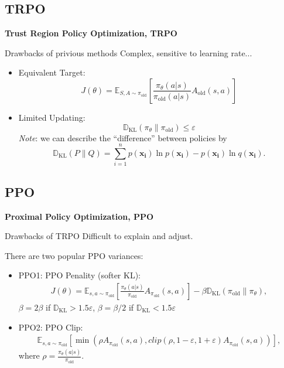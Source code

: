 \subsection{TRPO}
\begin{frame}
\textbf{Trust Region Policy Optimization, TRPO}
\begin{block}{Drawbacks of privious methods}
Complex, sensitive to learning rate...
\end{block}
\begin{itemize}
\item Equivalent Target:
$$
J(\theta) = \mathbb{E}_{S,A \sim \pi_{\text{old}}}\left[
\frac{\pi_\theta(a|s)}{\pi_{\text{old}}(a|s)} A_{\text{old}}(s,a)
\right]
$$
\item Limited Updating: $$
\mathbb{D}_{\text{KL}}(\pi_\theta \| \pi_{\text{old}}) \leq \varepsilon
$$
\textit{Note}: we can describe the ``difference'' between policies by
$$
\mathbb{D}_{\text{KL}}(P\|Q) = \sum_{i=1}^n p(\mathbf{x_i})\ln p(\mathbf{x_i}) - p(\mathbf{x_i}) \ln q(\mathbf{x_i}).
$$
\end{itemize}
\end{frame}
\subsection{PPO}
\begin{frame}
\textbf{Proximal Policy Optimization, PPO}
\begin{block}{Drawbacks of TRPO}
Difficult to explain and adjust.
\end{block}
There are two popular PPO variances:
\begin{itemize}
\item  PPO1: PPO Penality (softer KL):
\begin{align*}
J(\theta) =
\mathbb{E}_{s,a \sim \pi_{\text{old}}}
\left[
\frac{\pi_\theta(a|s)}{\pi_{\text{old}}} A_{\pi_{\text{old}}}(s,a)
\right]
- \beta \mathbb{D}_{\text{KL}}(\pi_{\text{old}}\| \pi_\theta),
\end{align*}
$\beta =2\beta$ if $\mathbb{D}_{\text{KL}} > 1.5\varepsilon$, $\beta=\beta/2$ if $\mathbb{D}_{\text{KL}} < 1.5\varepsilon$
\item PPO2: PPO Clip:
\begin{align*}
\mathbb{E}_{s,a \sim \pi_{\text{old}}}
\left[
\min \left(
\rho A_{\pi_{\text{old}}}(s,a),
clip(\rho, 1 - \varepsilon, 1 + \varepsilon)A_{\pi_{\text{old}}}(s,a)
\right)
\right] ,
\end{align*}
where $\rho = \frac{\pi_\theta(a|s)}{\pi_{\text{old}}}$.
\end{itemize}
\end{frame}
